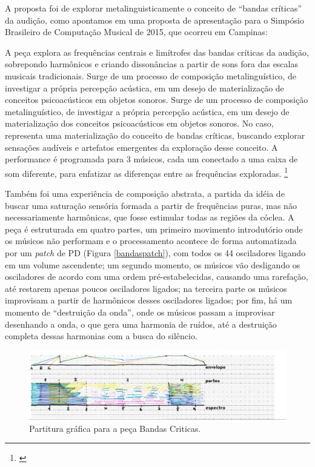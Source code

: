 A proposta foi de explorar metalinguisticamente o conceito de ``bandas críticas'' da audição, como apontamos em uma proposta de apresentação para o Simpósio Brasileiro de Computação Musical de 2015, que ocorreu em Campinas:


\begin{citacao}
A peça explora as frequências centrais e limítrofes das bandas críticas da audição, sobrepondo harmônicos e criando dissonâncias a partir de sons fora das escalas musicais tradicionais. Surge de um processo de composição metalinguístico, de investigar a própria percepção acústica, em um desejo de materialização de conceitos psicoacústicos em objetos sonoros. 
Surge de um processo de composição metalinguístico, de investigar a própria percepção acústica, em um desejo de materialização dos conceitos psicoacústicos em objetos sonoros. No caso, representa uma materialização do conceito de bandas críticas, buscando explorar sensações audíveis e artefatos emergentes da exploração desse conceito. A performance é programada para 3 músicos, cada um conectado a uma caixa de som diferente, para enfatizar as diferenças entre as frequências exploradas. \footnote{\cite{ArianeStolfi2015}}
\end{citacao}

Também foi uma experiência de composição abstrata, a partida da idéia de buscar uma saturação sensória formada a partir de frequências puras, mas não necessariamente harmônicas, que fosse estimular todas as regiões da cóclea. A peça é estruturada em quatro partes, um primeiro movimento introdutório onde os músicos não performam e o processamento acontece de forma automatizada por um \emph{patch} de PD (Figura \ref{bandaspatch}), com todos os 44 osciladores ligando em um volume ascendente; um segundo momento, os músicos vão desligando os osciladores de acordo com uma ordem pré-estabelecidas, causando uma rarefação, até restarem apenas poucos osciladores ligados; na terceira parte os músicos improvisam a partir de harmônicos desses osciladores ligados; por fim, há um momento de ``destruição da onda'', onde os músicos passam a improvisar desenhando a onda, o que gera uma harmonia de ruídos, até a destruição completa dessas harmonias com a busca do silêncio.

\begin{figure}[htb]
    \caption{\label{bandaspartitura}Partitura gráfica para a peça Bandas Criticas. }
    \begin{center}
    \includegraphics[width=1\linewidth]{pictures/cap3/bandascriticaspartitura}
    \end{center}
\end{figure}

